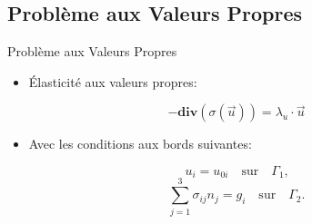 \documentclass[french]{beamer}
\begin{document}
\subsection{Problème aux Valeurs Propres} 
\begin{frame}{Problème aux Valeurs Propres} 
  \begin{itemize}
     \item Élasticité aux valeurs propres:
  \end{itemize}

  

  \begin{equation}
   - \mathbf{div}  \left( \sigma \left(\vec{u}\right) \right) = \lambda_u \cdot \vec{u}
  \end{equation}
  \pause
    \begin{itemize}
     \item Avec les conditions aux bords suivantes:
  \end{itemize}

\[u_i = u_{0i} \quad \text{sur} \quad \Gamma_1 \text{,} \]
\pause
\[\sum_{j=1}^3 \sigma_{ij} n_j  = g_i \quad \text{sur} \quad \Gamma_2 \text{.}\]
  
\end{frame}
\end{document}
